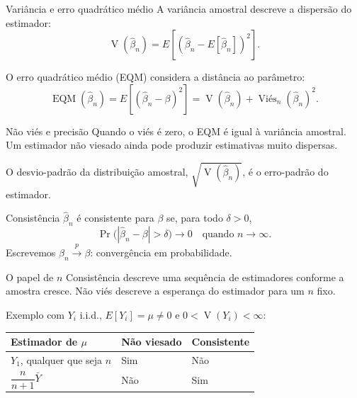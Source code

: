 \documentclass[
  ignorenonframetext,
  brazilian,
  aspectratio=169,
  10pt]{beamer}
\begin{document}
\begin{frame}{Variância e erro quadrático médio}
\protect{}\label{variuxe2ncia-e-erro-quadruxe1tico-muxe9dio}
A variância amostral descreve a dispersão do estimador: \[
\operatorname{V}(\widehat\beta_n)
=E\!\left[(\widehat\beta_n-E[\widehat\beta_n])^2\right].
\]

O erro quadrático médio (EQM) considera a distância ao parâmetro: \[
\boxed{\operatorname{EQM}(\widehat\beta_n)
=E[(\widehat\beta_n-\beta)^2]
=\operatorname{V}(\widehat\beta_n)+\operatorname{Viés}_n(\widehat\beta_n)^2.}
\]

\begin{block}{Não viés e precisão}
Quando o viés é zero, o EQM é igual à variância amostral.
Um estimador não viesado ainda pode produzir estimativas muito dispersas.
\end{block}

\small

O desvio-padrão da distribuição amostral,
\(\sqrt{\operatorname{V}(\widehat\beta_n)}\), é o erro-padrão do
estimador.
\end{frame}

\begin{frame}{Consistência}
\protect{}\label{consistuxeancia}
\(\widehat\beta_n\) é consistente para \(\beta\) se, para todo
\(\delta>0\), \[
\boxed{\Pr\bigl(|\widehat\beta_n-\beta|>\delta\bigr)\longrightarrow 0
\quad\text{quando } n\longrightarrow\infty.}
\] Escrevemos \(\widehat\beta_n\xrightarrow{p}\beta\): convergência em
probabilidade.

\begin{block}{O papel de $n$}
Consistência descreve uma sequência de estimadores conforme a amostra cresce.
Não viés descreve a esperança do estimador para um $n$ fixo.
\end{block}

\small

Exemplo com \(Y_i\) i.i.d., \(E[Y_i]=\mu\neq0\) e
\(0<\operatorname{V}(Y_i)<\infty\):

\begin{center}
\begin{tabular}{lll}
\toprule
Estimador de $\mu$ & Não viesado & Consistente \\
\midrule
$Y_1$, qualquer que seja $n$ & Sim & Não \\
$\dfrac{n}{n+1}\bar Y$ & Não & Sim \\
\bottomrule
\end{tabular}
\end{center}
\end{frame}
\end{document}

